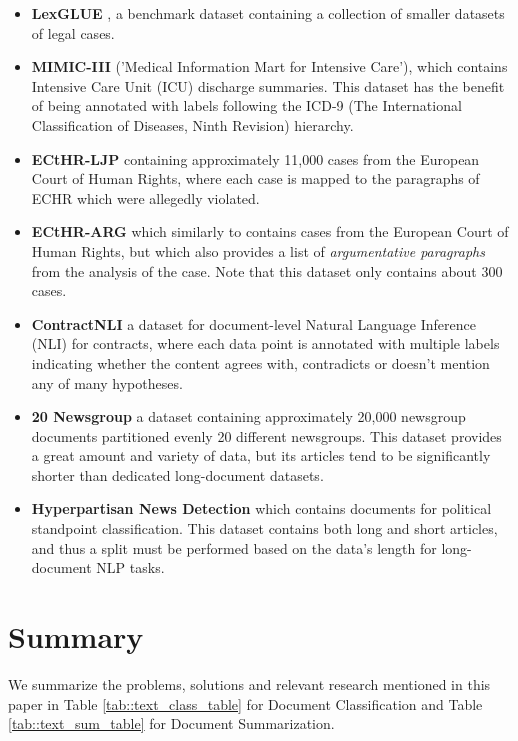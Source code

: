 \documentclass[preprint,review,12pt]{elsarticle}
\begin{document}
\begin{itemize}
    \item \textbf{LexGLUE} \cite{glue_gunner}, a benchmark dataset containing a collection of smaller datasets of legal cases.
    
    \item \textbf{MIMIC-III} \cite{mimic} ('Medical Information Mart for Intensive Care'), which contains Intensive Care Unit (ICU) discharge summaries. This dataset has the benefit of being annotated with labels following the ICD-9 (The International Classification of Diseases, Ninth Revision) hierarchy.

    \item \textbf{ECtHR-LJP} \cite{ion3} containing approximately 11,000 cases from the European Court of Human Rights, where each case is mapped to the paragraphs of ECHR which were allegedly violated.

    \item \textbf{ECtHR-ARG} \cite{habernal} which similarly to \cite{ion3} contains cases from the European Court of Human Rights, but which also provides a list of \textit{argumentative paragraphs} from the analysis of the case. Note that this dataset only contains about 300 cases.

    \item \textbf{ContractNLI} \cite{koreeda} a dataset for document-level Natural Language Inference (NLI) for contracts, where each data point is annotated with multiple labels indicating whether the content agrees with, contradicts or doesn't mention any of many hypotheses.

    \item \textbf{20 Newsgroup} \cite{20groups} a dataset containing approximately 20,000 newsgroup documents partitioned evenly 20 different newsgroups. This dataset provides a great amount and variety of data, but its articles tend to be significantly shorter than dedicated long-document datasets.

    \item \textbf{Hyperpartisan News Detection} \cite{hyperpartisan} which contains documents for political standpoint classification. This dataset contains both long and short articles, and thus a split must be performed based on the data's length for long-document NLP tasks.
\end{itemize}


    \section{Summary}
    \label{sec::Summary}
    We summarize the problems, solutions and relevant research mentioned in this paper in Table \ref{tab::text_class_table} for Document Classification and Table \ref{tab::text_sum_table} for Document Summarization.
\end{document}
